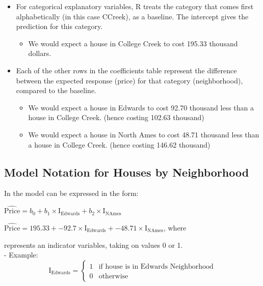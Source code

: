 \documentclass[]{book}
\providecommand{\tightlist}{%
  \setlength{\itemsep}{0pt}\setlength{\parskip}{0pt}}
\begin{document}
\begin{itemize}
\tightlist
\item
  For categorical explanatory variables, R treats the category that
  comes first alphabetically (in this case CCreek), as a baseline. The
  intercept gives the prediction for this category.

  \begin{itemize}
  \tightlist
  \item
    We would expect a house in College Creek to cost 195.33 thousand
    dollars.
  \end{itemize}
\item
  Each of the other rows in the coefficients table represent the
  difference between the expected response (price) for that category
  (neighborhood), compared to the baseline.

  \begin{itemize}
  \tightlist
  \item
    We would expect a house in Edwards to cost 92.70 thousand less than
    a house in College Creek. (hence costing 102.63 thousand)\\
  \item
    We would expect a house in North Ames to cost 48.71 thousand less
    than a house in College Creek. (hence costing 146.62 thousand)
  \end{itemize}
\end{itemize}

\subsection{Model Notation for Houses by
Neighborhood}\label{model-notation-for-houses-by-neighborhood}

In the model can be expressed in the form:

\(\widehat{\text{Price}}= b_0+ b_1 \times\text{I}_{\text{Edwards}} +b_2 \times\text{I}_{\text{NAmes}}\)

\(\widehat{\text{Price}}= 195.33+ -92.7 \times\text{I}_{\text{Edwards}} +-48.71 \times\text{I}_{\text{NAmes}}\),
where

 represents an indicator variables, taking on values 0 or 1.\\
- Example: \[ \text{I}_{\text{Edwards}} =\begin{cases} 
      1 & \text{if house is in Edwards Neighborhood} \\
      0 & \text{otherwise}
       \end{cases}
      \]
\end{document}
